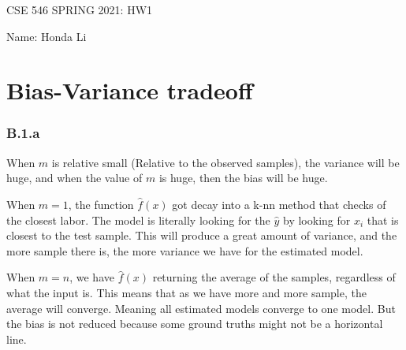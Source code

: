 \documentclass[]{article}
\begin{document}
\begin{center}
    CSE 546 SPRING 2021: HW1 
\end{center}
\begin{center}
    Name: Honda Li
\end{center}

\section*{Bias-Variance tradeoff}
    \subsubsection*{B.1.a}
        \hspace{1.1em}
        When $m$ is relative small (Relative to the observed samples), the variance will be huge, and when the value of $m$ is huge, then the bias will be huge. 
        \par
        When $m = 1$, the function $\hat{f}(x)$ got decay into a k-nn method that checks of the closest labor. The model is literally looking for the $\hat{y}$ by looking for $x_i$ that is closest to the test sample. This will produce a great amount of variance, and the more sample there is, the more variance we have for the estimated model. 
        \par
        When $m = n$, we have $\hat{f}(x)$ returning the average of the samples, regardless of what the input is. This means that as we have more and more sample, the average will converge. Meaning all estimated models converge to one model. But the bias is not reduced because some ground truths might not be a horizontal line. 
\end{document}
